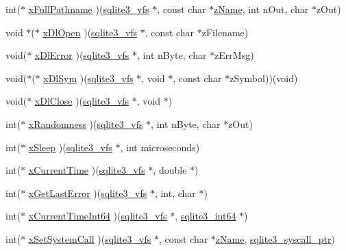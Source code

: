 \begin{DoxyCompactItemize}
\item 
int($\ast$ \hyperlink{structsqlite3__vfs_ae25f89e6402cb0f9cb50eaafa663c7a1}{x\+Full\+Pathname} )(\hyperlink{structsqlite3__vfs}{sqlite3\+\_\+vfs} $\ast$, const char $\ast$\hyperlink{structsqlite3__vfs_a58125535bc4b42100276f9f3390ffae0}{z\+Name}, int n\+Out, char $\ast$z\+Out)
\item 
void $\ast$($\ast$ \hyperlink{structsqlite3__vfs_a80e5a29a66984df865d51395dd024508}{x\+Dl\+Open} )(\hyperlink{structsqlite3__vfs}{sqlite3\+\_\+vfs} $\ast$, const char $\ast$z\+Filename)
\item 
void($\ast$ \hyperlink{structsqlite3__vfs_a2a682fd5ad29e633f65441e7147c6b38}{x\+Dl\+Error} )(\hyperlink{structsqlite3__vfs}{sqlite3\+\_\+vfs} $\ast$, int n\+Byte, char $\ast$z\+Err\+Msg)
\item 
void($\ast$($\ast$ \hyperlink{structsqlite3__vfs_ae43e7134858d88b6104cef2a4aef72d4}{x\+Dl\+Sym} )(\hyperlink{structsqlite3__vfs}{sqlite3\+\_\+vfs} $\ast$, void $\ast$, const char $\ast$z\+Symbol))(void)
\item 
void($\ast$ \hyperlink{structsqlite3__vfs_a9afef84db68e33bf6d94add4a8a7b24f}{x\+Dl\+Close} )(\hyperlink{structsqlite3__vfs}{sqlite3\+\_\+vfs} $\ast$, void $\ast$)
\item 
int($\ast$ \hyperlink{structsqlite3__vfs_ab2a1ae7c84e12eafb727d8def03d28a0}{x\+Randomness} )(\hyperlink{structsqlite3__vfs}{sqlite3\+\_\+vfs} $\ast$, int n\+Byte, char $\ast$z\+Out)
\item 
int($\ast$ \hyperlink{structsqlite3__vfs_a78dd047fb761ec85fb58582ba98b8bf9}{x\+Sleep} )(\hyperlink{structsqlite3__vfs}{sqlite3\+\_\+vfs} $\ast$, int microseconds)
\item 
int($\ast$ \hyperlink{structsqlite3__vfs_ad219f77cf376bde9d3c4cfd831116144}{x\+Current\+Time} )(\hyperlink{structsqlite3__vfs}{sqlite3\+\_\+vfs} $\ast$, double $\ast$)
\item 
int($\ast$ \hyperlink{structsqlite3__vfs_a489cbf27a20784bc30fec3bf363e62b2}{x\+Get\+Last\+Error} )(\hyperlink{structsqlite3__vfs}{sqlite3\+\_\+vfs} $\ast$, int, char $\ast$)
\item 
int($\ast$ \hyperlink{structsqlite3__vfs_a813afd045b5127c70a46991ad4b5ea9d}{x\+Current\+Time\+Int64} )(\hyperlink{structsqlite3__vfs}{sqlite3\+\_\+vfs} $\ast$, \hyperlink{sqlite3_8c_a0a4d3e6c1ad46f90e746b920ab6ca0d2}{sqlite3\+\_\+int64} $\ast$)
\item 
int($\ast$ \hyperlink{structsqlite3__vfs_a2f4a2d9488914d188408748b119533d7}{x\+Set\+System\+Call} )(\hyperlink{structsqlite3__vfs}{sqlite3\+\_\+vfs} $\ast$, const char $\ast$\hyperlink{structsqlite3__vfs_a58125535bc4b42100276f9f3390ffae0}{z\+Name}, \hyperlink{sqlite3_8h_a99a6393e96d7095fa024de9c1257aa6f}{sqlite3\+\_\+syscall\+\_\+ptr})

\end{DoxyCompactItemize}
